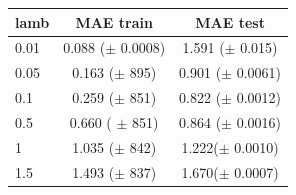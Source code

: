\begin{figure}[h]
\begin{minipage}{\textwidth}
\begin{minipage}[b]{0.45\textwidth}
  \end{minipage}
  \hfill
  \begin{minipage}[b]{0.5\textwidth}
  \begin{center}
  \begin{tabular}{ |l | c | c| }
    \hline
     lamb & MAE train & MAE test \\ \hline
     0.01   & 0.088 ($\pm$  0.0008) &  1.591 ($\pm$ 0.015) \\ \hline
     0.05  &  0.163 ($\pm$  895) &  0.901 ($\pm$  0.0061) \\ \hline
     0.1     & 0.259 ($\pm$ 851)  & 0.822 ($\pm$ 0.0012) \\ \hline
     0.5    & 0.660  ( $\pm$ 851) & 0.864 ($\pm$  0.0016)\\ \hline
     1       & 1.035 ($\pm$ 842) & 1.222($\pm$  0.0010)\\ \hline
     1.5    & 1.493 ($\pm$ 837) & 1.670($\pm$  0.0007) \\
    \hline
  \end{tabular}
\end{center}
	\vspace{10 mm}
    \end{minipage}
    
\label{fig:ALS_lambdas} 
  \end{minipage}
\end{figure}  
  

